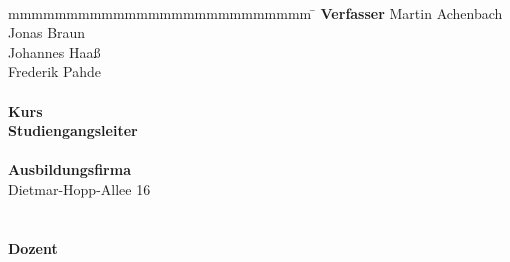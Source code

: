 \begin{titlepage}
\begin{center}
	 	  \vspace*{5mm}	\zeitraum\\
	\end{center}
	\vfill
	\begin{spacing}{1}
	\begin{tabbing}
		mmmmmmmmmmmmmmmmmmmmmmmmmm     \= \kill
		\textbf{Verfasser}		\> Martin Achenbach\\
								\> Jonas Braun\\
								\> Johannes Haaß\\
								\> Frederik Pahde\\
		\\
		\textbf{Kurs}  					\> \kurs\\
		\textbf{Studiengangsleiter}	   \>	\studiengangsleiter\\
		\\
		\textbf{Ausbildungsfirma}      \>  \firma\\
									\> Dietmar-Hopp-Allee 16\\
									\> \firmenort\\
									\\
		\textbf{Dozent}              \>  \betreuer \\
										\\
	\end{tabbing}
	\end{spacing}
\end{titlepage}
